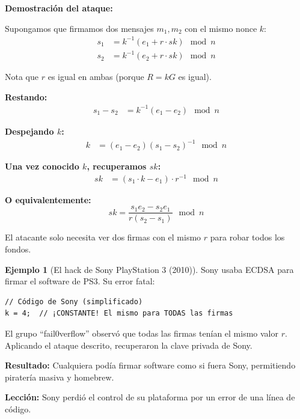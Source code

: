 \documentclass[11pt,a4paper,twoside,openright]{book}
\theoremstyle{definition}
\newtheorem{example}{Ejemplo}[chapter]
\theoremstyle{plain}
\theoremstyle{remark}
\begin{document}
\begin{mathnote}
\textbf{Demostración del ataque:}

Supongamos que firmamos dos mensajes $m_1, m_2$ con el mismo nonce $k$:
\begin{align}
s_1 &= k^{-1}(e_1 + r \cdot sk) \mod n \\
s_2 &= k^{-1}(e_2 + r \cdot sk) \mod n
\end{align}

Nota que $r$ es igual en ambas (porque $R = kG$ es igual).

\textbf{Restando:}
\begin{align}
s_1 - s_2 &= k^{-1}(e_1 - e_2) \mod n
\end{align}

\textbf{Despejando $k$:}
\begin{align}
k &= (e_1 - e_2)(s_1 - s_2)^{-1} \mod n
\end{align}

\textbf{Una vez conocido $k$, recuperamos $sk$:}
\begin{align}
sk &= (s_1 \cdot k - e_1) \cdot r^{-1} \mod n
\end{align}

\textbf{O equivalentemente:}
\[
sk = \frac{s_1 e_2 - s_2 e_1}{r(s_2 - s_1)} \mod n
\]

El atacante solo necesita ver dos firmas con el mismo $r$ para robar todos los fondos.
\end{mathnote}

\begin{example}[El hack de Sony PlayStation 3 (2010)]
Sony usaba ECDSA para firmar el software de PS3. Su error fatal:

\begin{verbatim}
// Código de Sony (simplificado)
k = 4;  // ¡CONSTANTE! El mismo para TODAS las firmas
\end{verbatim}

El grupo ``fail0verflow'' observó que todas las firmas tenían el mismo valor $r$.
Aplicando el ataque descrito, recuperaron la clave privada de Sony.

\textbf{Resultado:} Cualquiera podía firmar software como si fuera Sony, permitiendo piratería masiva y homebrew.

\textbf{Lección:} Sony perdió el control de su plataforma por un error de una línea de código.
\end{example}
\end{document}
